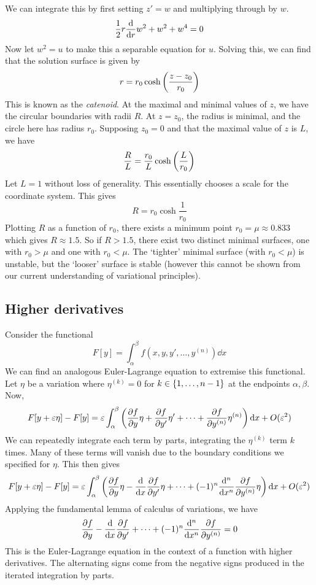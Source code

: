We can integrate this by first setting \( z' = w \) and multiplying through by \( w \).
\[
	\frac{1}{2}r\dv{r} w^2 + w^2 + w^4 = 0
\]
Now let \( w^2 = u \) to make this a separable equation for \( u \).
Solving this, we can find that the solution surface is given by
\[
	r = r_0 \cosh \qty(\frac{z-z_0}{r_0})
\]
This is known as the \textit{catenoid}.
At the maximal and minimal values of \( z \), we have the circular boundaries with radii \( R \).
At \( z = z_0 \), the radius is minimal, and the circle here has radius \( r_0 \).
Supposing \( z_0 = 0 \) and that the maximal value of \( z \) is \( L \), we have
\[
	\frac{R}{L} = \frac{r_0}{L} \cosh \qty(\frac{L}{r_0})
\]
Let \( L = 1 \) without loss of generality.
This essentially chooses a scale for the coordinate system.
This gives
\[
	R = r_0 \cosh \frac{1}{r_0}
\]
Plotting \( R \) as a function of \( r_0 \), there exists a minimum point \( r_0 = \mu \approx 0.833 \) which gives \( R \approx 1.5 \).
So if \( R > 1.5 \), there exist two distinct minimal surfaces, one with \( r_0 > \mu \) and one with \( r_0 < \mu \).
The `tighter' minimal surface (with \( r_0 < \mu \)) is unstable, but the `looser' surface is stable (however this cannot be shown from our current understanding of variational principles).

\subsection{Higher derivatives}
Consider the functional
\[
	F[y] = \int_\alpha^\beta f(x,y,y',\dots,y^{(n)}) \dd{x}
\]
We can find an analogous Euler-Lagrange equation to extremise this functional.
Let \( \eta \) be a variation where \( \eta^{(k)} = 0 \) for \( k \in \qty{1, \dots, n-1} \) at the endpoints \( \alpha, \beta \).
Now,
\[
	F[y+\varepsilon \eta] - F[y] = \varepsilon\int_\alpha^\beta \qty(\pdv{f}{y} \eta + \pdv{f}{y'}\eta' + \dots + \pdv{f}{y^{(n)}}\eta^{(n)}) \dd{x} + O(\varepsilon^2)
\]
We can repeatedly integrate each term by parts, integrating the \( \eta^{(k)} \) term \( k \) times.
Many of these terms will vanish due to the boundary conditions we specified for \( \eta \).
This then gives
\[
	F[y+\varepsilon \eta] - F[y] = \varepsilon\int_\alpha^\beta \qty(\pdv{f}{y} \eta - \dv{x} \pdv{f}{y'}\eta + \dots + (-1)^n \dv[n]{x} \pdv{f}{y^{(n)}}\eta) \dd{x} + O(\varepsilon^2)
\]
Applying the fundamental lemma of calculus of variations, we have
\[
	\pdv{f}{y} - \dv{x} \pdv{f}{y'} + \dots + (-1)^n \dv[n]{x} \pdv{f}{y^{(n)}} = 0
\]
This is the Euler-Lagrange equation in the context of a function with higher derivatives.
The alternating signs come from the negative signs produced in the iterated integration by parts.

